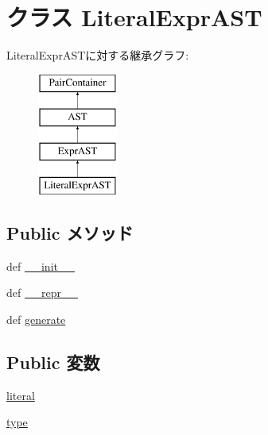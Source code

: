 \hypertarget{classslicc_1_1ast_1_1LiteralExprAST_1_1LiteralExprAST}{
\section{クラス LiteralExprAST}
\label{classslicc_1_1ast_1_1LiteralExprAST_1_1LiteralExprAST}
}
LiteralExprASTに対する継承グラフ:\begin{figure}[H]
\begin{center}
\leavevmode
\includegraphics[height=4cm]{classslicc_1_1ast_1_1LiteralExprAST_1_1LiteralExprAST}
\end{center}
\end{figure}
\subsection*{Public メソッド}
\begin{DoxyCompactItemize}
\item 
def \hyperlink{classslicc_1_1ast_1_1LiteralExprAST_1_1LiteralExprAST_ac775ee34451fdfa742b318538164070e}{\_\-\_\-init\_\-\_\-}
\item 
def \hyperlink{classslicc_1_1ast_1_1LiteralExprAST_1_1LiteralExprAST_ad8b9328939df072e4740cd9a63189744}{\_\-\_\-repr\_\-\_\-}
\item 
def \hyperlink{classslicc_1_1ast_1_1LiteralExprAST_1_1LiteralExprAST_a4555d1cee0dccf3942ea35fe86de2e8e}{generate}
\end{DoxyCompactItemize}
\subsection*{Public 変数}
\begin{DoxyCompactItemize}
\item 
\hyperlink{classslicc_1_1ast_1_1LiteralExprAST_1_1LiteralExprAST_a767e7f06ae4dd8e521d9d48e24625f02}{literal}
\item 
\hyperlink{classslicc_1_1ast_1_1LiteralExprAST_1_1LiteralExprAST_a7aead736a07eaf25623ad7bfa1f0ee2d}{type}
\end{DoxyCompactItemize}


